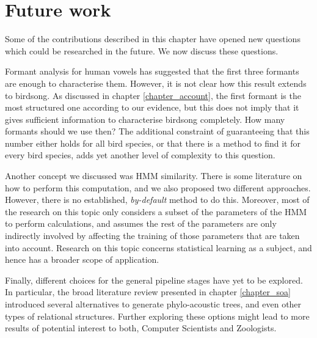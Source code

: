 \documentclass[../main.tex]{subfiles}
\begin{document}
\section{Future work} \label{section_future}
Some of the contributions described in this chapter have opened new questions which could be researched in the future. We now discuss these questions.
\par Formant analysis for human vowels has suggested that the first three formants are enough to characterise them. However, it is not clear how this result extends to birdsong. As discussed in chapter \ref{chapter_account}, the first formant is the most structured one according to our evidence, but this does not imply that it gives sufficient information to characterise birdsong completely. How many formants should we use then? The additional constraint of guaranteeing that this number either holds for all bird species, or that there is a method to find it for every bird species, adds yet another level of complexity to this question.
\par Another concept we discussed was HMM similarity. There is some literature on how to perform this computation, and we also proposed two different approaches. However, there is no established, \emph{by-default} method to do this. Moreover, most of the research on this topic only considers a subset of the parameters of the HMM to perform calculations, and assumes the rest of the parameters are only indirectly involved by affecting the training of those parameters that are taken into account. Research on this topic concerns statistical learning as a subject, and hence has a broader scope of application.
\par Finally, different choices for the general pipeline stages have yet to be explored. In particular, the broad literature review presented in chapter \ref{chapter_soa} introduced several alternatives to generate phylo-acoustic trees, and even other types of relational structures. Further exploring these options might lead to more results of potential interest to both, Computer Scientists and Zoologists.
\end{document}
